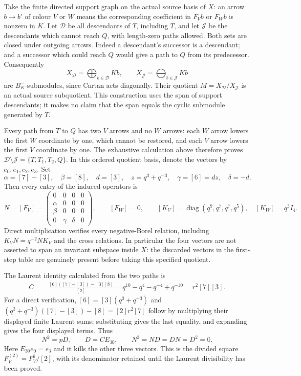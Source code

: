 Take the finite directed support graph on the actual source basis of
$X$: an arrow $b\to b'$ of colour $V$ or $W$ means the corresponding
coefficient in $F_Vb$ or $F_Wb$ is nonzero in $K$. Let $\mathcal D$
be all descendants of $T$, including $T$, and let $\mathcal J$ be
the descendants which cannot reach $Q$, with length-zero paths allowed.
Both sets are closed under outgoing arrows. Indeed a descendant's
successor is a descendant; and a successor which could reach $Q$
would give a path to $Q$ from its predecessor. Consequently
\[
 X_{\mathcal D}=\bigoplus_{b\in\mathcal D}Kb,
 \qquad X_{\mathcal J}=\bigoplus_{b\in\mathcal J}Kb
\]
are $B^-_K$-submodules, since Cartan acts diagonally. Their quotient
$M=X_{\mathcal D}/X_{\mathcal J}$ is an actual source subquotient.
This construction uses the span of support descendants; it makes no
claim that the span equals the cyclic submodule generated by $T$.

Every path from $T$ to $Q$ has two $V$ arrows and no $W$ arrows:
each $W$ arrow lowers the first $W$ coordinate by one, which cannot
be restored, and each $V$ arrow lowers the first $V$ coordinate by
one. The exhaustive calculation above therefore proves
$\mathcal D\setminus\mathcal J=\{T,T_1,T_2,Q\}$.
In this ordered quotient basis, denote the vectors by $e_0,e_1,e_2,e_3$.
Set
\[
 \alpha=[7]-[3],\quad \beta=[8],\quad d=[3],\quad
 z=q^3+q^{-3},\quad\gamma=[6]=dz,\quad\delta=-d.
\]
Then every entry of the induced operators is
\[
 N=[F_V]=\begin{pmatrix}0&0&0&0\\
 \alpha&0&0&0\\ \beta&0&0&0\\0&\gamma&\delta&0\end{pmatrix},
 \qquad [F_W]=0,\qquad
 [K_V]=\operatorname{diag}(q^9,q^7,q^7,q^5),\quad[K_W]=q^3I_4.
\]
Direct multiplication verifies every negative-Borel relation, including
$K_VN=q^{-2}NK_V$ and the cross relations. In particular the four
vectors are not asserted to span an invariant subspace inside $X$:
the discarded vectors in the first-step table are genuinely present
before taking this specified quotient.

The Laurent identity calculated from the two paths is
\begin{align}
 C&=\frac{[6]([7]-[3])-[3][8]}{[2]}
   =q^{10}-q^4-q^{-4}+q^{-10}
   =r^2[7][3].\label{eq:gct-block-C}
\end{align}
For a direct verification, $[6]=[3](q^3+q^{-3})$ and
$(q^3+q^{-3})([7]-[3])-[8]=[2]r^2[7]$ follow by multiplying
their displayed finite Laurent sums; substituting gives the last
equality, and expanding gives the four displayed terms.
Thus
\[
 N^2=pD,\qquad D=CE_{30},\qquad N^3=ND=DN=D^2=0.
\]
Here $E_{30}e_0=e_3$ and it kills the other three vectors. This is
the divided square $F_V^{(2)}=F_V^2/[2]$, with its denominator retained
until the Laurent divisibility has been proved.

